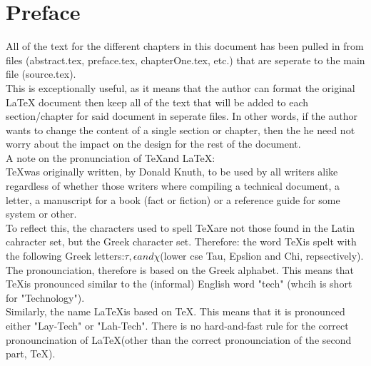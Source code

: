 \chapter*{Preface}

All of the text for the different chapters in this document has been pulled in from files (abstract.tex, preface.tex, chapterOne.tex, etc.) that are seperate to the main file (source.tex).\\
\indent{}This is exceptionally useful, as it means that the author can format the original \LaTeX{} document then keep all of the text that will be added to each section/chapter for said document in seperate files. In other words, if the author wants to change the content of a single section or chapter, then the he  need not worry about the impact on the design for the rest of the document.\\
\indent{}A note on the pronunciation of \TeX and \LaTeX:\\
\indent{}\TeX was originally written, by Donald Knuth, to be used by all writers alike regardless of whether those writers where compiling a technical document, a letter, a manuscript for a book (fact or fiction) or a reference guide for some system or other.\\
\indent{}To reflect this, the characters used to spell \TeX are not those found in the Latin cahracter set, but the Greek character set. Therefore: the word \TeX is spelt with the following Greek letters:\begin{math}\tau, \epsilon and \chi \end{math}(lower cse Tau, Epslion and Chi, repsectively).\\
\indent{}The pronounciation, therefore is based on the Greek alphabet. This means that \TeX is pronounced similar to the (informal) English word "tech" (whcih is short for "Technology").\\
\indent{}Similarly, the name \LaTeX is based on \TeX. This means that it is pronounced either "Lay-Tech" or "Lah-Tech". There is no hard-and-fast rule for the correct  pronouncination of \LaTeX (other than the correct pronounciation of the second part, \TeX).


